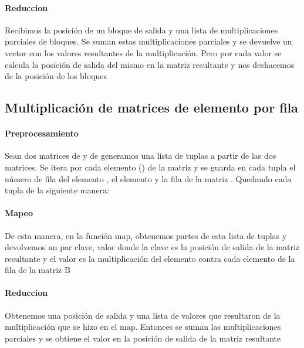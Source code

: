    \paragraph{Reduccion}

        Recibimos la posición de un bloque de salida y una lista de
        multiplicaciones parciales de bloques. Se suman estas multiplicaciones
        parciales y se devuelve un vector con los valores resultantes de la
        multiplicación. Pero por cada valor se calcula la posición de salida del
        mismo en la matriz resultante y nos deshacemos de la posición de los
        bloques

\subsection{Multiplicación de matrices de elemento por fila}

    \paragraph{Preprocesamiento}

        Sean dos matrices  de  y  de 
        generamos una lista de tuplas a partir de las dos matrices.
        Se itera por cada elemento () de la matriz  y se
        guarda en cada tupla el número de fila  del elemento
        , el elemento  y la fila  de la
        matriz . Quedando cada tupla de la siguiente manera:\\

    \paragraph{Mapeo}

        De esta manera, en la función map, obtenemos partes de esta lista de
        tuplas y devolvemos un par clave, valor donde la clave es la posición
        de salida de la matriz resultante  y el valor es la
        multiplicación del elemento  contra cada elemento de la
        fila  de la matriz B

    \paragraph{Reduccion}

        Obtenemos una posición de salida y una lista de valores que resultaron
        de la multiplicación que se hizo en el map. Entonces se suman las
        multiplicaciones parciales y se obtiene el valor en la posición de salida
        de la matriz resultante

